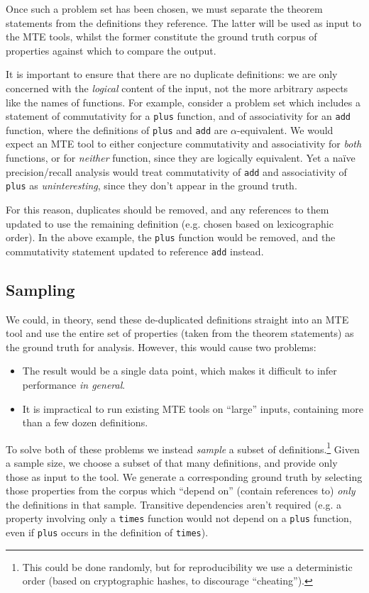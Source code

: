 Once such a problem set has been chosen, we must separate the theorem statements
from the definitions they reference. The latter will be used as input to the
MTE tools, whilst the former constitute the ground truth corpus of properties
against which to compare the output.

It is important to ensure that there are no duplicate definitions: we are only
concerned with the \emph{logical} content of the input, not the more arbitrary
aspects like the names of functions. For example, consider a problem set which
includes a statement of commutativity for a \texttt{plus} function, and of
associativity for an \texttt{add} function, where the definitions of
\texttt{plus} and \texttt{add} are $\alpha$-equivalent. We would expect an MTE
tool to either conjecture commutativity and associativity for \emph{both}
functions, or for \emph{neither} function, since they are logically equivalent.
Yet a na\"ive precision/recall analysis would treat commutativity of
\texttt{add} and associativity of \texttt{plus} as \emph{uninteresting}, since
they don't appear in the ground truth.

For this reason, duplicates should be removed, and any references to them
updated to use the remaining definition (e.g. chosen based on lexicographic
order). In the above example, the \texttt{plus} function would be removed, and
the commutativity statement updated to reference \texttt{add} instead.

\subsection{Sampling}
\label{section:sampling}

We could, in theory, send these de-duplicated definitions straight into an MTE
tool and use the entire set of properties (taken from the theorem statements) as
the ground truth for analysis. However, this would cause two problems:

\begin{itemize}
\item The result would be a single data point, which makes it difficult to
  infer performance \emph{in general}.
\item It is impractical to run existing MTE tools on ``large'' inputs,
  containing more than a few dozen definitions.
\end{itemize}

To solve both of these problems we instead \emph{sample} a subset of
definitions.\footnote{This could be done randomly, but for reproducibility we
  use a deterministic order (based on cryptographic hashes, to discourage
  ``cheating'').} Given a sample size, we choose a subset of that many definitions,
and provide only those as input to the tool. We generate a corresponding
ground truth by selecting those properties from the corpus which ``depend on''
(contain references to) \emph{only} the definitions in that sample. Transitive
dependencies aren't required (e.g. a property involving only a \texttt{times}
function would not depend on a \texttt{plus} function, even if \texttt{plus}
occurs in the definition of \texttt{times}).

